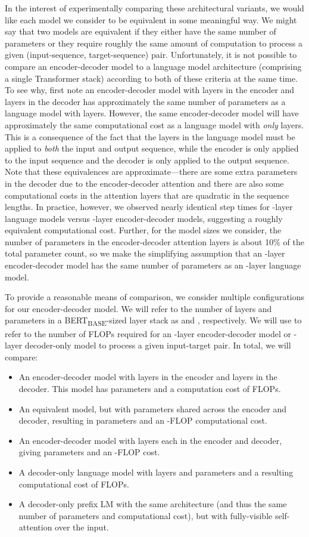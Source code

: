\documentclass[twoside,11pt]{article}
\begin{document}
In the interest of experimentally comparing these architectural variants, we would like each model we consider to be equivalent in some meaningful way.
We might say that two models are equivalent if they either have the same number of parameters or they require roughly the same amount of computation to process a given (input-sequence, target-sequence) pair.
Unfortunately, it is not possible to compare an encoder-decoder model to a language model architecture (comprising a single Transformer stack) according to both of these criteria at the same time.
To see why, first note an encoder-decoder model with  layers in the encoder and  layers in the decoder has approximately the same number of parameters as a language model with  layers.
However, the same  encoder-decoder model will have approximately the same computational cost as a language model with \textit{only}  layers.
This is a consequence of the fact that the  layers in the language model must be applied to \textit{both} the input and output sequence, while the encoder is only applied to the input sequence and the decoder is only applied to the output sequence.
Note that these equivalences are approximate---there are some extra parameters in the decoder due to the encoder-decoder attention and there are also some computational costs in the attention layers that are quadratic in the sequence lengths.
In practice, however, we observed nearly identical step times for -layer language models versus -layer encoder-decoder models, suggesting a roughly equivalent computational cost.
Further, for the model sizes we consider, the number of parameters in the encoder-decoder attention layers is about 10\% of the total parameter count, so we make the simplifying assumption that an -layer encoder-decoder model has the same number of parameters as an -layer language model.

To provide a reasonable means of comparison, we consider multiple configurations for our encoder-decoder model.
We will refer to the number of layers and parameters in a BERT\textsubscript{BASE}-sized layer stack as  and , respectively.
We will use  to refer to the number of FLOPs required for an -layer encoder-decoder model or -layer decoder-only model to process a given input-target pair.
In total, we will compare:
\begin{itemize}
    \item An encoder-decoder model with  layers in the encoder and  layers in the decoder. This model has  parameters and a computation cost of  FLOPs.
    \item An equivalent model, but with parameters shared across the encoder and decoder, resulting in  parameters and an -FLOP computational cost.
    \item An encoder-decoder model with  layers each in the encoder and decoder, giving  parameters and an -FLOP cost.
    \item A decoder-only language model with  layers and  parameters and a resulting computational cost of  FLOPs.
    \item A decoder-only prefix LM with the same architecture (and thus the same number of parameters and computational cost), but with fully-visible self-attention over the input.
\end{itemize}
\end{document}
